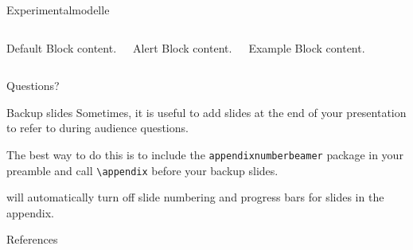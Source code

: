 \begin{frame}{Experimentalmodelle}
\begin{columns}[T,onlytextwidth]

      \begin{block}{Default}
        Block content.
      \end{block}

      \begin{alertblock}{Alert}
        Block content.
      \end{alertblock}

      \begin{exampleblock}{Example}
        Block content.
      \end{exampleblock}
  \end{columns}
\end{frame}

{
\begin{frame}[standout]
  Questions?
\end{frame}
}

\appendix

\begin{frame}[fragile]{Backup slides}
  Sometimes, it is useful to add slides at the end of your presentation to
  refer to during audience questions.

  The best way to do this is to include the \verb|appendixnumberbeamer|
  package in your preamble and call \verb|\appendix| before your backup slides.

  \themename will automatically turn off slide numbering and progress bars for
  slides in the appendix.
\end{frame}

\begin{frame}[allowframebreaks]{References}

  
  

\end{frame}





